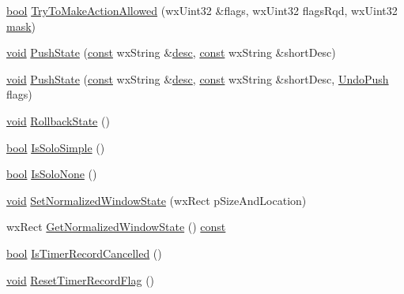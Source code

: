 \begin{DoxyCompactItemize}
\item 
\hyperlink{mac_2config_2i386_2lib-src_2libsoxr_2soxr-config_8h_abb452686968e48b67397da5f97445f5b}{bool} \hyperlink{class_audacity_project_ae62e336f7aa67f06583bbfd38aadf2df}{Try\+To\+Make\+Action\+Allowed} (wx\+Uint32 \&flags, wx\+Uint32 flags\+Rqd, wx\+Uint32 \hyperlink{structmask}{mask})
\item 
\hyperlink{sound_8c_ae35f5844602719cf66324f4de2a658b3}{void} \hyperlink{class_audacity_project_ae9457cac877fe88c8d3857f92692f101}{Push\+State} (\hyperlink{getopt1_8c_a2c212835823e3c54a8ab6d95c652660e}{const} wx\+String \&\hyperlink{_export_p_c_m_8cpp_a717c8108dd6ce1ecc369d9bac2f471f2}{desc}, \hyperlink{getopt1_8c_a2c212835823e3c54a8ab6d95c652660e}{const} wx\+String \&short\+Desc)
\item 
\hyperlink{sound_8c_ae35f5844602719cf66324f4de2a658b3}{void} \hyperlink{class_audacity_project_aa362064ef09a96cf9d73b2fff5890cd5}{Push\+State} (\hyperlink{getopt1_8c_a2c212835823e3c54a8ab6d95c652660e}{const} wx\+String \&\hyperlink{_export_p_c_m_8cpp_a717c8108dd6ce1ecc369d9bac2f471f2}{desc}, \hyperlink{getopt1_8c_a2c212835823e3c54a8ab6d95c652660e}{const} wx\+String \&short\+Desc, \hyperlink{_undo_manager_8h_a4df60e74fafdd06fb39cd12db3388114}{Undo\+Push} flags)
\item 
\hyperlink{sound_8c_ae35f5844602719cf66324f4de2a658b3}{void} \hyperlink{class_audacity_project_aa04c5ec89d7df126960103e1f6c0faad}{Rollback\+State} ()
\item 
\hyperlink{mac_2config_2i386_2lib-src_2libsoxr_2soxr-config_8h_abb452686968e48b67397da5f97445f5b}{bool} \hyperlink{class_audacity_project_a88c4d1a0e26189895eb79d15e53fa4f4}{Is\+Solo\+Simple} ()
\item 
\hyperlink{mac_2config_2i386_2lib-src_2libsoxr_2soxr-config_8h_abb452686968e48b67397da5f97445f5b}{bool} \hyperlink{class_audacity_project_ac6e4e1879dcd8da096c315f712f37f1d}{Is\+Solo\+None} ()
\item 
\hyperlink{sound_8c_ae35f5844602719cf66324f4de2a658b3}{void} \hyperlink{class_audacity_project_a32bc4142f8d6460aae2e260c2369ac21}{Set\+Normalized\+Window\+State} (wx\+Rect p\+Size\+And\+Location)
\item 
wx\+Rect \hyperlink{class_audacity_project_a3103dc608c996f86f6f94c46c5dd5065}{Get\+Normalized\+Window\+State} () \hyperlink{getopt1_8c_a2c212835823e3c54a8ab6d95c652660e}{const} 
\item 
\hyperlink{mac_2config_2i386_2lib-src_2libsoxr_2soxr-config_8h_abb452686968e48b67397da5f97445f5b}{bool} \hyperlink{class_audacity_project_ac4ef0c68ceb94a2eb129c9019e176d87}{Is\+Timer\+Record\+Cancelled} ()
\item 
\hyperlink{sound_8c_ae35f5844602719cf66324f4de2a658b3}{void} \hyperlink{class_audacity_project_a299204431ca403d1d5d59cb5ea98d310}{Reset\+Timer\+Record\+Flag} ()
\end{DoxyCompactItemize}
